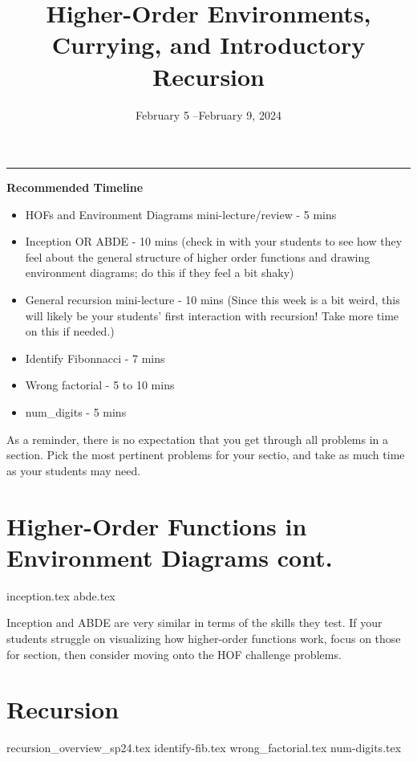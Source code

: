 \documentclass{exam}
\title{Higher-Order Environments, Currying, and Introductory Recursion}
\date{February 5 --February 9, 2024}
\begin{document}
\maketitle
\rule{\textwidth}{0.15em}
\fontsize{12}{15}\selectfont

\begin{meta}
\textbf{Recommended Timeline}
\begin{itemize}
    \item HOFs and Environment Diagrams mini-lecture/review - 5 mins
    \item Inception OR ABDE - 10 mins (check in with your students to see how they feel about the general structure of higher order functions and drawing environment diagrams; do this if they feel a bit shaky)
    \item General recursion mini-lecture - 10 mins (Since this week is a bit weird, this will likely be your students' first interaction with recursion! Take more time on this if needed.)
    \item Identify Fibonnacci - 7 mins
    \item Wrong factorial - 5 to 10 mins
    \item num\_digits - 5 mins
\end{itemize}
As a reminder, there is no expectation that you get through all problems in a section. Pick the most pertinent problems for your sectio, and take as much time as your students may need. 
\end{meta}

\begin{questions}
    \section{Higher-Order Functions in Environment Diagrams cont.}
    {inception.tex}
    {abde.tex}
    \begin{questionmeta}
        Inception and ABDE are very similar in terms of the skills they test. If your students struggle on visualizing how higher-order functions work, focus on those for section, then consider moving onto the HOF challenge problems.
    \end{questionmeta}

    \section{Recursion}
    {recursion_overview_sp24.tex}
    {identify-fib.tex}
    {wrong_factorial.tex}
    {num-digits.tex}
\end{questions}
\end{document}
